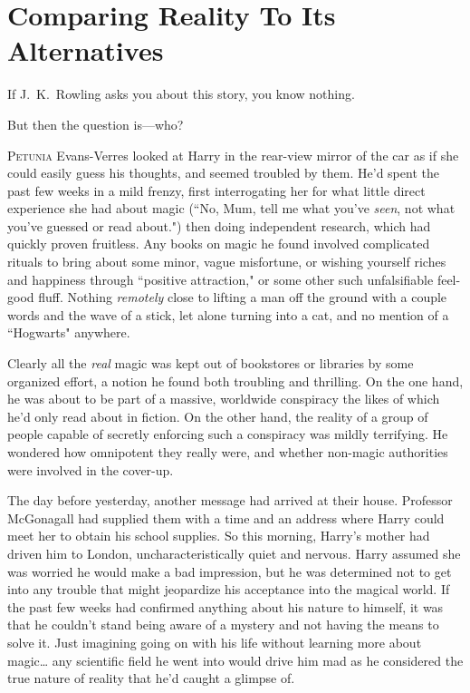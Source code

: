 \chapter{Comparing Reality To Its Alternatives}

\begin{chapterOpeningAuthorNote}
If J.~K.~Rowling asks you about this story, you know nothing.
\end{chapterOpeningAuthorNote}
\begin{chapterOpeningQuote}
But then the question is—who?
\end{chapterOpeningQuote}

\lettrine{P}{etunia} Evans-Verres looked at Harry in the rear-view mirror of the car as if she could easily guess his thoughts, and seemed troubled by them. He'd spent the past few weeks in a mild frenzy, first interrogating her for what little direct experience she had about magic (``No, Mum, tell me what you've \emph{seen}, not what you've guessed or read about.") then doing independent research, which had quickly proven fruitless. Any books on magic he found involved complicated rituals to bring about some minor, vague misfortune, or wishing yourself riches and happiness through ``positive attraction," or some other such unfalsifiable feel-good fluff. Nothing \emph{remotely} close to lifting a man off the ground with a couple words and the wave of a stick, let alone turning into a cat, and no mention of a ``Hogwarts" anywhere.

Clearly all the \emph{real} magic was kept out of bookstores or libraries by some organized effort, a notion he found both troubling and thrilling. On the one hand, he was about to be part of a massive, worldwide conspiracy the likes of which he'd only read about in fiction. On the other hand, the reality of a group of people capable of secretly enforcing such a conspiracy was mildly terrifying. He wondered how omnipotent they really were, and whether non-magic authorities were involved in the cover-up.

The day before yesterday, another message had arrived at their house. Professor McGonagall had supplied them with a time and an address where Harry could meet her to obtain his school supplies. So this morning, Harry's mother had driven him to London, uncharacteristically quiet and nervous. Harry assumed she was worried he would make a bad impression, but he was determined not to get into any trouble that might jeopardize his acceptance into the magical world. If the past few weeks had confirmed anything about his nature to himself, it was that he couldn't stand being aware of a mystery and not having the means to solve it. Just imagining going on with his life without learning more about magic{\ldots} any scientific field he went into would drive him mad as he considered the true nature of reality that he'd caught a glimpse of.

